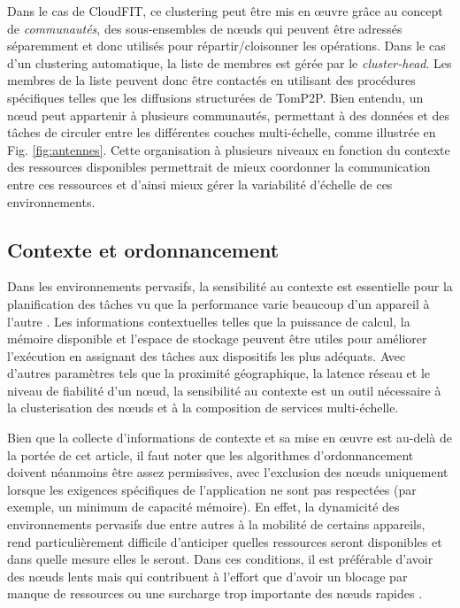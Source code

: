 Dans le cas de CloudFIT, ce clustering peut être mis en \oe{}uvre grâce au concept de \textit{communautés}, des sous-ensembles de n\oe{}uds qui peuvent être adressés séparemment et donc utilisés pour répartir/cloisonner les opérations. Dans le cas d'un clustering automatique, la liste de membres est gérée par le \textit{cluster-head}. Les membres de la liste peuvent donc être contactés en utilisant des procédures spécifiques telles que les diffusions structurées de TomP2P. Bien entendu, un n\oe{}ud peut appartenir à plusieurs communautés, permettant à des données et des tâches de circuler entre les différentes couches multi-échelle, comme illustrée en Fig. \ref{fig:antennes}. 
Cette organisation à plusieurs niveaux en fonction du contexte des ressources disponibles permettrait de mieux coordonner la communication entre ces ressources et d'ainsi mieux gérer la variabilité d'échelle de ces environnements. 



\subsection{Contexte et ordonnancement}

Dans les environnements pervasifs, la sensibilité au contexte est essentielle pour la planification des tâches vu que la performance varie beaucoup d'un appareil à l'autre \cite{Dey2013}. Les informations contextuelles telles que la puissance de calcul, la mémoire disponible et l'espace de stockage peuvent être utiles pour améliorer l'exécution en assignant des tâches aux dispositifs les plus adéquats. Avec d'autres paramètres tels que la proximité géographique, la latence réseau et le niveau de fiabilité d'un n\oe{}ud, la sensibilité au contexte est un outil nécessaire à la clusterisation des n\oe{}uds et à la composition de services multi-échelle.

Bien que la collecte d'informations de contexte et sa mise en \oe{}uvre est au-delà de la portée de cet article, il faut noter que les algorithmes d'ordonnancement doivent néanmoins être assez permissives, avec l'exclusion des n\oe{}uds uniquement lorsque les exigences spécifiques de l'application ne sont pas respectées (par exemple, un minimum de capacité mémoire). 
En effet, la dynamicité des environnements pervasifs due entre autres à la mobilité de certains appareils, rend particulièrement difficile d'anticiper quelles ressources seront disponibles et dans quelle mesure elles le seront. Dans ces conditions,  
il est préférable d'avoir des n\oe{}uds lents mais qui contribuent à l'effort que d'avoir un blocage par manque de ressources ou une surcharge trop importante des n\oe{}uds rapides \cite{Cassales2016,Wang2015}.   



